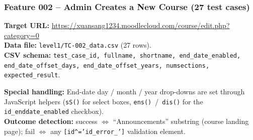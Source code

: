 \documentclass[twoside,final]{hcmut-report}
\begin{document}
\subsubsection{Feature 002 -- Admin Creates a New Course (27 test cases)}

\textbf{Target URL:} \url{https://xuansang1234.moodlecloud.com/course/edit.php?category=0}\\
\textbf{Data file:} \texttt{level1/TC-002\_data.csv} (27 rows).\\
\textbf{CSV schema:} \texttt{test\_case\_id, fullname, shortname, end\_date\_enabled, end\_date\_offset\_days, end\_date\_offset\_years, numsections, expected\_result}.

\textbf{Special handling:} End-date day / month / year drop-downs are set through JavaScript helpers (\texttt{sS()} for select boxes, \texttt{ens()}~/~\texttt{dis()} for the \texttt{id\_enddate\_enabled} checkbox).\\
\textbf{Outcome detection:} success $\Leftrightarrow$ ``Announcements'' substring (course landing page); fail $\Leftrightarrow$ any \texttt{[id\^{}='id\_error\_']} validation element.
\end{document}
